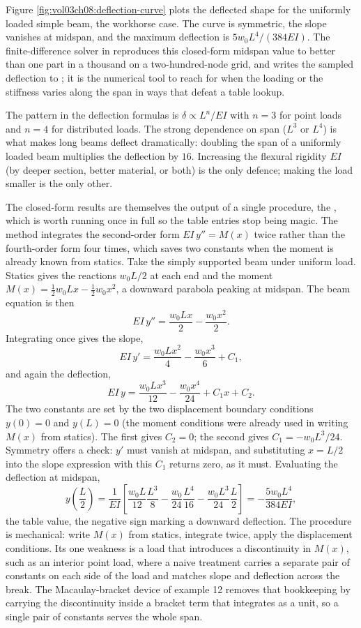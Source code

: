 

Figure \ref{fig:vol03ch08:deflection-curve} plots the deflected shape
for the uniformly loaded simple beam, the workhorse case. The curve is
symmetric, the slope vanishes at midspan, and the maximum deflection is
$5w_0L^4/(384EI)$. The finite-difference solver in
 reproduces this closed-form midspan
value to better than one part in a thousand on a two-hundred-node grid,
and writes the sampled deflection to ;
it is the numerical tool to reach for when the loading or the stiffness
varies along the span in ways that defeat a table lookup.

The pattern in the deflection formulas is $\delta \propto L^n / EI$
with $n = 3$ for point loads and $n = 4$ for distributed loads. The
strong dependence on span ($L^3$ or $L^4$) is what makes long beams
deflect dramatically: doubling the span of a uniformly loaded beam
multiplies the deflection by $16$. Increasing the flexural rigidity
$EI$ (by deeper section, better material, or both) is the only
defence; making the load smaller is the only other.

The closed-form results are themselves the output of a single procedure,
the , which is worth running once in
full so the table entries stop being magic. The method integrates the
second-order form $EI\,y''=M(x)$ twice rather than the fourth-order form
four times, which saves two constants when the moment is already known
from statics. Take the simply supported beam under uniform load. Statics
gives the reactions $w_0L/2$ at each end and the moment
$M(x)=\tfrac12 w_0 L x - \tfrac12 w_0 x^2$, a downward parabola peaking at
midspan. The beam equation is then
\[
EI\,y'' = \frac{w_0 L x}{2} - \frac{w_0 x^2}{2}.
\]
Integrating once gives the slope,
\[
EI\,y' = \frac{w_0 L x^2}{4} - \frac{w_0 x^3}{6} + C_1,
\]
and again the deflection,
\[
EI\,y = \frac{w_0 L x^3}{12} - \frac{w_0 x^4}{24} + C_1 x + C_2.
\]
The two constants are set by the two displacement boundary conditions
$y(0)=0$ and $y(L)=0$ (the moment conditions were already used in writing
$M(x)$ from statics). The first gives $C_2=0$; the second gives
$C_1=-w_0L^3/24$. Symmetry offers a check: $y'$ must vanish at midspan,
and substituting $x=L/2$ into the slope expression with this $C_1$
returns zero, as it must. Evaluating the deflection at midspan,
\[
y\!\left(\frac{L}{2}\right) = \frac{1}{EI}\left[
\frac{w_0 L}{12}\frac{L^3}{8} - \frac{w_0}{24}\frac{L^4}{16}
- \frac{w_0 L^3}{24}\frac{L}{2}\right]
= -\frac{5 w_0 L^4}{384 EI},
\]
the table value, the negative sign marking a downward deflection. The
procedure is mechanical: write $M(x)$ from statics, integrate twice, apply
the displacement conditions. Its one weakness is a load that introduces a
discontinuity in $M(x)$, such as an interior point load, where a naive
treatment carries a separate pair of constants on each side of the load
and matches slope and deflection across the break. The Macaulay-bracket
device of example 12 removes that bookkeeping by carrying the
discontinuity inside a bracket term that integrates as a unit, so a single
pair of constants serves the whole span.

